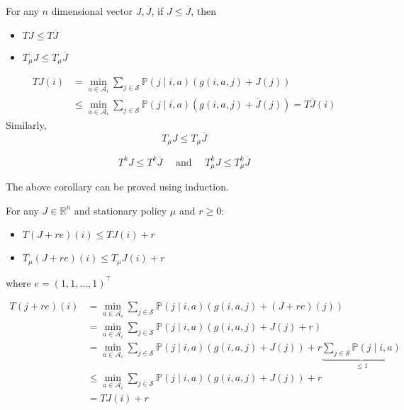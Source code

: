 \begin{lemma}
    For any \(n\) dimensional vector \(J, \overline{J} \), if \(J \leq \overline{J} \), then
        \begin{itemize}
            \item \(TJ \leq T \overline{J}\)
            \item \(T_\mu J \leq T_\mu \overline{J}\)  
        \end{itemize}
\end{lemma}
\begin{lemmaproof}
    \[
        \begin{aligned}
            TJ(i) &= \min_{a \in \mathcal{A}_i} \sum_{j \in \mathcal{S} } \mathbb{P} (j\mid i,a) ( 
                g(i,a,j) + J(j) )\\
                & \leq \min_{a \in \mathcal{A}_i} \sum_{j \in \mathcal{S} } \mathbb{P} (j\mid i,a) ( 
                    g(i,a,j) + \overline{J}(j) ) = T\overline{J}(i)
        \end{aligned}
    \]
    Similarly,
    \[
        T_\mu J \leq T_\mu \overline{J}
    \]
\end{lemmaproof}
\begin{corollary}
    \[
        T^k J \leq T^{k} \overline{J} \quad \text{ and } \quad T^k_\mu J \leq T^k_\mu \overline{J} 
    \]
\end{corollary}
The above corollary can be proved using induction.
\begin{lemma}
    For any \( J \in  \mathbb{R} ^n\) and stationary policy \(\mu \) and \(r \geq 0\):
    \begin{itemize}
        \item \(T (J +re)(i) \leq TJ(i) + r\)
        \item \(T_\mu (J +re)(i) \leq T_\mu J(i) + r\)
    \end{itemize}
    where \(e = (1,1,\dots ,1)^{\top}\) 
\end{lemma}
\begin{lemmaproof}
    \[
        \begin{aligned}
            T(j +re)(i) & = \min _{a \in \mathcal{A}_i} \sum_{j \in \mathcal{S} } \mathbb{P} (j\mid i,a) ( 
                g(i,a,j) + (J + re)(j) )\\
                &= \min _{a \in \mathcal{A}_i} \sum_{j \in \mathcal{S} } \mathbb{P} (j\mid i,a) ( 
                    g(i,a,j) + J(j) + r )\\
                &= \min _{a \in \mathcal{A}_i} \sum_{j \in \mathcal{S} } \mathbb{P} (j\mid i,a) ( 
                        g(i,a,j) + J(j) ) + r 
                        \underbrace{\sum_{j \in \mathcal{S} } \mathbb{P} (j\mid i,a)}_{\leq 1}\\
                &\leq \min _{a \in \mathcal{A}_i} \sum_{j \in \mathcal{S} } \mathbb{P} (j\mid i,a) ( 
                    g(i,a,j) + J(j) ) + r \\
                &= TJ(i) + r 
        \end{aligned}
    \]
\end{lemmaproof}